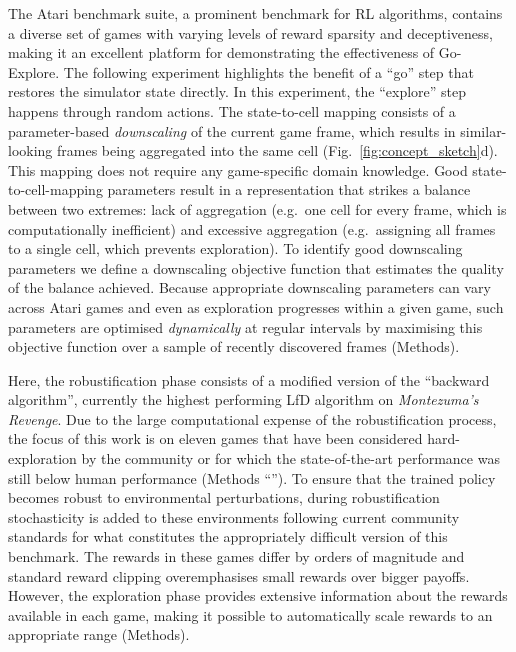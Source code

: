 \documentclass{nature}
\renewcommand*{\cite}[1]{\supercite{#1}}
\begin{document}
The Atari benchmark suite\cite{bellemare2013arcade}, a prominent benchmark for RL algorithms\cite{mnih:nature15,horgan:apexdqn2018,espeholt:impala2018}, contains a diverse set of games with varying levels of reward sparsity and deceptiveness, making it an excellent platform for demonstrating the effectiveness of Go-Explore.
The following experiment highlights the benefit of a ``go'' step that restores the simulator state directly.
In this experiment, the ``explore'' step happens through random actions. The state-to-cell mapping consists of a parameter-based \emph{downscaling} of the current game frame, which results in similar-looking frames being aggregated into the same cell (Fig.~\ref{fig:concept_sketch}d). This mapping does not require any game-specific domain knowledge.
Good state-to-cell-mapping parameters result in a representation that strikes a balance between two extremes: lack of aggregation (e.g.\ one cell for every frame, which is computationally inefficient) and excessive aggregation (e.g.\ assigning all frames to a single cell, which prevents exploration).
To identify good downscaling parameters we define a downscaling objective function that estimates the quality of the balance achieved.
Because appropriate downscaling parameters can vary across Atari games and even as exploration progresses within a given game, such parameters are optimised \emph{dynamically} at regular intervals by maximising this objective function over a sample of recently discovered frames (Methods).

Here, the robustification phase consists of a modified version of the ``backward algorithm''\cite{salimans2018learning}, currently the highest performing LfD algorithm on \emph{Montezuma's Revenge}.
Due to the large computational expense of the robustification process, the focus of this work is on eleven games that have been considered hard-exploration by the community\cite{bellemare2016unifying} or for which the state-of-the-art performance was still below human performance (Methods ``''). 
To ensure that the trained policy becomes robust to environmental perturbations, during robustification stochasticity is added to these environments following current community standards for what constitutes the appropriately difficult version of this benchmark\cite{Machado2018RevisitingTA}.
The rewards in these games differ by orders of magnitude and standard reward clipping overemphasises small rewards over bigger payoffs.
However, the exploration phase provides extensive information about the rewards available in each game, making it possible to automatically scale rewards to an appropriate range (Methods).
\end{document}
